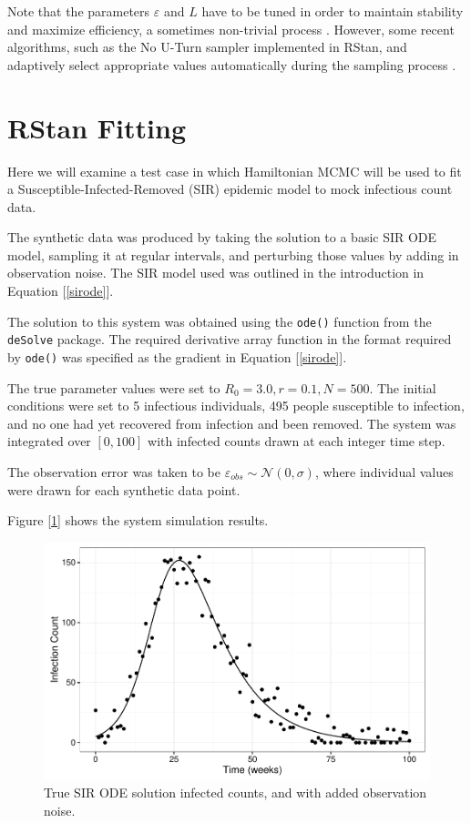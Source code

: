     Note that the parameters $\varepsilon$ and $L$ have to be tuned in order to maintain stability and maximize efficiency, a sometimes non-trivial process \cite{Neal2011}. However, some recent algorithms, such as the No U-Turn sampler implemented in RStan, and adaptively select appropriate values automatically during the sampling process \cite{Hoffman2014}.
    

\section{RStan Fitting}

    Here we will examine a test case in which Hamiltonian MCMC will be used to fit a Susceptible-Infected-Removed (SIR) epidemic model to mock infectious count data.

    The synthetic data was produced by taking the solution to a basic SIR ODE model, sampling it at regular intervals, and perturbing those values by adding in observation noise. The SIR model used was outlined in the introduction in Equation [\ref{sirode}].

    The solution to this system was obtained using the \verb|ode()| function from the \verb|deSolve| package. The required derivative array function in the format required by \verb|ode()| was specified as the gradient in Equation [\ref{sirode}].

    The true parameter values were set to $R_0 = 3.0, r = 0.1, N = 500$. The initial conditions were set to 5 infectious individuals, 495 people susceptible to infection, and no one had yet recovered from infection and been removed. The system was integrated over $[0,100]$ with infected counts drawn at each integer time step.

    The observation error was taken to be $\varepsilon_{obs} \sim \mathcal{N}(0,\sigma)$, where individual values were drawn for each synthetic data point.

    Figure [\ref{mcmcdataplot}] shows the system simulation results.

    \begin{figure}
        \centering
        \includegraphics[width=\textwidth]{./images/dataplot.pdf}
        \caption{True SIR ODE solution infected counts, and with added observation noise. \label{mcmcdataplot}}
    \end{figure}

